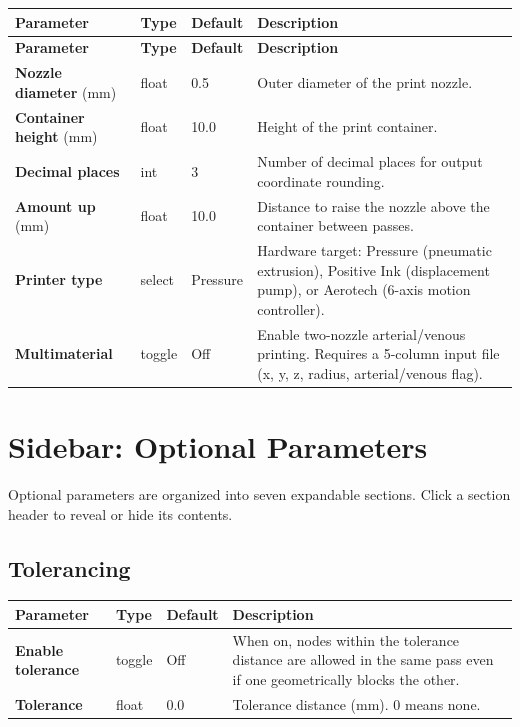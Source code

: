 \documentclass[11pt,letterpaper]{article}
\newcommand{\gui}[1]{\textcolor{guicolor}{\textsf{\textbf{#1}}}}
\begin{document}
\begin{longtable}{L{3cm} l l L{6.5cm}}
\toprule
\textbf{Parameter} & \textbf{Type} & \textbf{Default} & \textbf{Description} \\
\midrule
\endfirsthead
\toprule
\textbf{Parameter} & \textbf{Type} & \textbf{Default} & \textbf{Description} \\
\midrule
\endhead
\gui{Nozzle diameter} (mm) & float & 0.5 & Outer diameter of the print nozzle. \\
\gui{Container height} (mm) & float & 10.0 & Height of the print container. \\
\gui{Decimal places} & int & 3 & Number of decimal places for output coordinate rounding. \\
\gui{Amount up} (mm) & float & 10.0 & Distance to raise the nozzle above the container between passes. \\
\gui{Printer type} & select & Pressure & Hardware target: Pressure (pneumatic extrusion), Positive Ink (displacement pump), or Aerotech (6-axis motion controller). \\
\gui{Multimaterial} & toggle & Off & Enable two-nozzle arterial/venous printing. Requires a 5-column input file (x, y, z, radius, arterial/venous flag). \\
\bottomrule
\end{longtable}

\section{Sidebar: Optional Parameters}
\label{sec:optional-params}

Optional parameters are organized into seven expandable sections. Click a
section header to reveal or hide its contents.

\subsection{Tolerancing}

\begin{tabularx}{\textwidth}{L{3.2cm} l l X}
\toprule
\textbf{Parameter} & \textbf{Type} & \textbf{Default} & \textbf{Description} \\
\midrule
\gui{Enable tolerance} & toggle & Off & When on, nodes within the tolerance distance are allowed in the same pass even if one geometrically blocks the other. \\
\gui{Tolerance} & float & 0.0 & Tolerance distance (mm). 0 means none. \\
\bottomrule
\end{tabularx}
\end{document}
